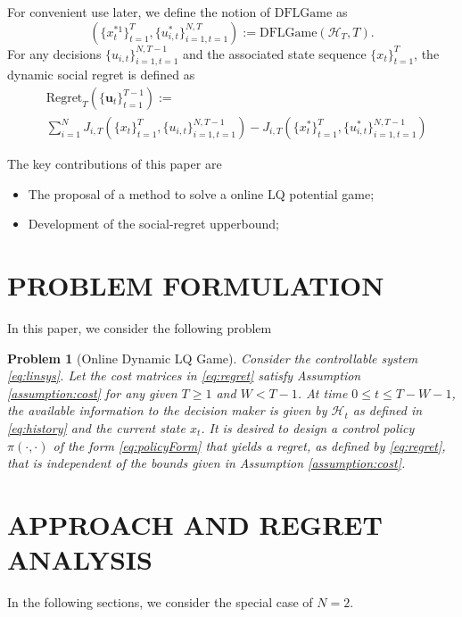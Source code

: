 \documentclass[letterpaper, 10 pt, conference]{ieeeconf}  %
\newcommand{\usequence}[2]{\{u_{i,t}\}_{i=1,t=1}^{#1,#2}}
\newtheorem{problem}{Problem}
\begin{document}
For convenient use later, we define the notion of $\text{DFLGame}$ as
\begin{equation}\label{eq:regret}
 (\{x_{t}^{*1}\}_{t=1}^{T}, \{u_{i,t}^{*}\}_{i=1,t=1}^{N,T}) := \text{DFLGame}(\mathcal{H}_{T},T).
\end{equation}
For any decisions $\usequence{N}{T-1}$ and the associated state sequence $\{x_{t}\}_{t=1}^{T}$, the dynamic social regret is defined as
\begin{equation}
    \begin{split}
        &\text{Regret}_{T}(\{\mathbf{u}_{t}\}_{t=1}^{T-1}) := \\
        &\sum_{i=1}^{N} J_{i,T}(\{x_{t}\}_{t=1}^{T},\{u_{i,t}\}_{i=1,t=1}^{N,T-1}) - J_{i,T}(\{x_{t}^{*}\}_{t=1}^{T},\{u_{i,t}^{*}\}_{i=1,t=1}^{N,T-1})
    \end{split}
\end{equation}


The key contributions of this paper are
\begin{itemize}
    \item The proposal of a method to solve a online LQ potential game;
    \item Development of the social-regret upperbound;
\end{itemize}


\section{PROBLEM FORMULATION}
In this paper, we consider the following problem
\begin{problem}[Online Dynamic LQ Game]
     Consider the controllable system \eqref{eq:linsys}. Let the cost matrices in \eqref{eq:regret} satisfy Assumption \ref{assumption:cost} for any given $T \geq 1$ and $W < T-1$. At time $0 \leq t \leq T-W-1$, the available information to the decision maker is given by $\mathcal{H}_{t}$ as defined in \eqref{eq:history} and the current state $x_{t}$. It is desired to design a control policy $\pi(\cdot, \cdot)$ of the form \eqref{eq:policyForm} that yields a regret, as defined by \eqref{eq:regret}, that is independent of the bounds given in Assumption \ref{assumption:cost}.
\end{problem}

\section{APPROACH AND REGRET ANALYSIS}
In the following sections, we consider the special case of $N = 2$. 
\end{document}
